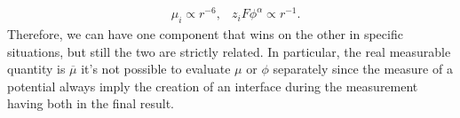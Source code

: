 \begin{align}
    &\mu_i \propto r^{-6}, &z_iF\phi^\alpha \propto r^{-1}.
\end{align}
Therefore, we can have one component that wins on the other in specific situations, but still the two are strictly related. In particular, the real measurable quantity is $\overline{\mu}$ it's not possible to evaluate $\mu$ or $\phi$ separately since the measure of a potential always imply the creation of an interface during the measurement having both in the final result.